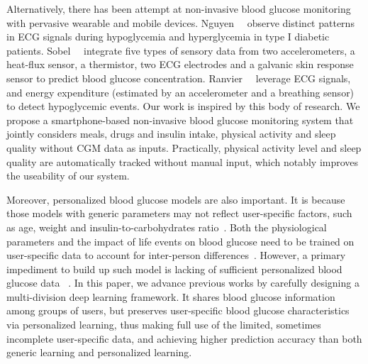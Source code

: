 Alternatively, there has been attempt at non-invasive blood glucose monitoring with pervasive wearable and mobile devices.
Nguyen~\etal~\cite{bib:EMBC12:Nguyen} observe distinct patterns in ECG signals during hypoglycemia and hyperglycemia in type I diabetic patients.
Sobel~\etal~\cite{bib:JDST14:Sobel} integrate five types of sensory data from two accelerometers, a heat-flux sensor, a thermistor, two ECG electrodes and a galvanic skin response sensor to predict blood glucose concentration.
Ranvier~\etal~\cite{bib:SEMPER16:Ranvier} leverage ECG signals, and energy expenditure (estimated by an accelerometer and a breathing sensor) to detect hypoglycemic events.
Our work is inspired by this body of research. We propose a smartphone-based non-invasive blood glucose monitoring system that jointly considers meals, drugs and insulin intake, physical activity and sleep quality without CGM data as inputs.
Practically, physical activity level and sleep quality are automatically tracked without manual input, which notably improves the useability of our system.


Moreover, personalized blood glucose models are also important. It is because those models with generic parameters may not reflect user-specific factors, such as age, weight and insulin-to-carbohydrates ratio~\cite{bib:IJNMBE16:Oviedo}.
Both the physiological parameters and the impact of life events on blood glucose need to be trained on user-specific data to account for inter-person differences~\cite{bib:ICMLA13:Bunescu}.
However, a primary impediment to build up such model is lacking of sufficient personalized blood glucose data ~\cite{bib:KDHealth16:Marling}.
In this paper, we advance previous works by carefully designing a multi-division deep learning framework. It shares blood glucose information among groups of users, but preserves user-specific blood glucose characteristics via personalized learning, thus making full use of the limited, sometimes incomplete user-specific data, and achieving higher prediction accuracy than both generic learning and personalized learning.

